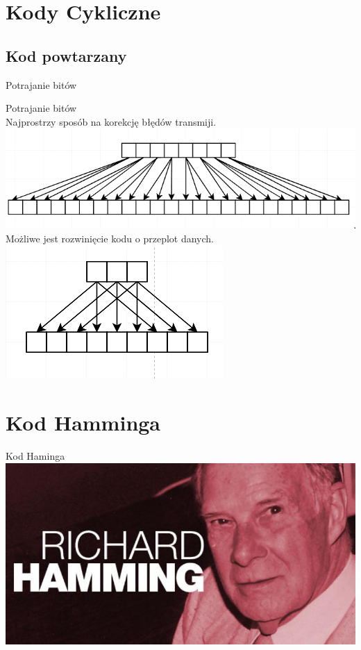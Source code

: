 \documentclass[12pt]{beamer}
\begin{document}
\section{Kody Cykliczne}
\setcounter{section}{1}

\subsection{Kod powtarzany}
\begin{frame}{Potrajanie bitów}
\begin{center}
Potrajanie bitów\\
Najprostrzy sposób na korekcję błędów transmiji.
\includegraphics[scale= 0.25]{Potrajanie/potrajanie_proste.png}\\
Możliwe jest rozwinięcie kodu o przeplot danych.
\includegraphics[scale=0.25]{Potrajanie/potrajanie_przeplot.png}

\end{center}

\end{frame}


\section{Kod Hamminga}
\begin{frame}{Kod Haminga}
\centering
\includegraphics[scale= 0.5]{image_source/ham.jpg}
\end{frame}
\end{document}
